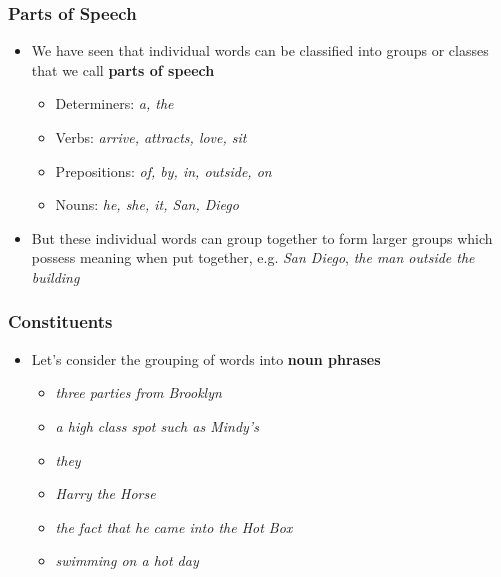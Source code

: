 
\ifx\pdfoutput\undefined
\else
\fi

\raggedright





\begin{frame}
\frametitle{Parts of Speech}
\begin{itemize}
\item We have seen that individual words can be classified into groups
  or classes that we call {\bf parts of speech}
\begin{itemize}
\item Determiners: {\em a, the}
\item Verbs: {\em arrive, attracts, love, sit}
\item Prepositions: {\em of, by, in, outside, on}
\item Nouns: {\em he, she, it, San, Diego}
\end{itemize}
\item But these individual words can group together to form larger
  groups which possess meaning when put together, e.g. {\em San
  Diego}, {\em the man outside the building}
\end{itemize}

\end{frame}

\begin{frame}
\frametitle{Constituents}
\begin{itemize}
\item Let's consider the grouping of words into {\bf noun phrases}
\begin{itemize}
\item {\em three parties from Brooklyn}
\item {\em a high class spot such as Mindy's}
\item {\em they}
\item {\em Harry the Horse}
\item {\em the fact that he came into the Hot Box}
\item {\em swimming on a hot day}
\end{itemize}
\end{itemize}

\end{frame}

